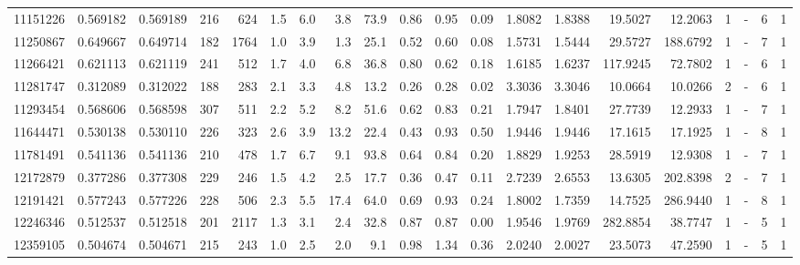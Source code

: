 \begin{tabular}{rrrrrrrrrrrrrrrrrlrl}
  11151226 & 0.569182 & 0.569189 &  216 &  624 &      1.5 &      6.0 &     3.8 &    73.9 &   0.86 &   0.95 &       0.09 &  1.8082 &  1.8388 &   19.5027 &   12.2063 &       1 &             - &        6 &         1 \\
  11250867 & 0.649667 & 0.649714 &  182 & 1764 &      1.0 &      3.9 &     1.3 &    25.1 &   0.52 &   0.60 &       0.08 &  1.5731 &  1.5444 &   29.5727 &  188.6792 &       1 &             - &        7 &         1 \\
  11266421 & 0.621113 & 0.621119 &  241 &  512 &      1.7 &      4.0 &     6.8 &    36.8 &   0.80 &   0.62 &       0.18 &  1.6185 &  1.6237 &  117.9245 &   72.7802 &       1 &             - &        6 &         1 \\
  11281747 & 0.312089 & 0.312022 &  188 &  283 &      2.1 &      3.3 &     4.8 &    13.2 &   0.26 &   0.28 &       0.02 &  3.3036 &  3.3046 &   10.0664 &   10.0266 &       2 &             - &        6 &         1 \\
  11293454 & 0.568606 & 0.568598 &  307 &  511 &      2.2 &      5.2 &     8.2 &    51.6 &   0.62 &   0.83 &       0.21 &  1.7947 &  1.8401 &   27.7739 &   12.2933 &       1 &             - &        7 &         1 \\
  11644471 & 0.530138 & 0.530110 &  226 &  323 &      2.6 &      3.9 &    13.2 &    22.4 &   0.43 &   0.93 &       0.50 &  1.9446 &  1.9446 &   17.1615 &   17.1925 &       1 &             - &        8 &         1 \\
  11781491 & 0.541136 & 0.541136 &  210 &  478 &      1.7 &      6.7 &     9.1 &    93.8 &   0.64 &   0.84 &       0.20 &  1.8829 &  1.9253 &   28.5919 &   12.9308 &       1 &             - &        7 &         1 \\
  12172879 & 0.377286 & 0.377308 &  229 &  246 &      1.5 &      4.2 &     2.5 &    17.7 &   0.36 &   0.47 &       0.11 &  2.7239 &  2.6553 &   13.6305 &  202.8398 &       2 &             - &        7 &         1 \\
  12191421 & 0.577243 & 0.577226 &  228 &  506 &      2.3 &      5.5 &    17.4 &    64.0 &   0.69 &   0.93 &       0.24 &  1.8002 &  1.7359 &   14.7525 &  286.9440 &       1 &             - &        8 &         1 \\
  12246346 & 0.512537 & 0.512518 &  201 & 2117 &      1.3 &      3.1 &     2.4 &    32.8 &   0.87 &   0.87 &       0.00 &  1.9546 &  1.9769 &  282.8854 &   38.7747 &       1 &             - &        5 &         1 \\
  12359105 & 0.504674 & 0.504671 &  215 &  243 &      1.0 &      2.5 &     2.0 &     9.1 &   0.98 &   1.34 &       0.36 &  2.0240 &  2.0027 &   23.5073 &   47.2590 &       1 &             - &        5 &         1 \\

\end{tabular}

